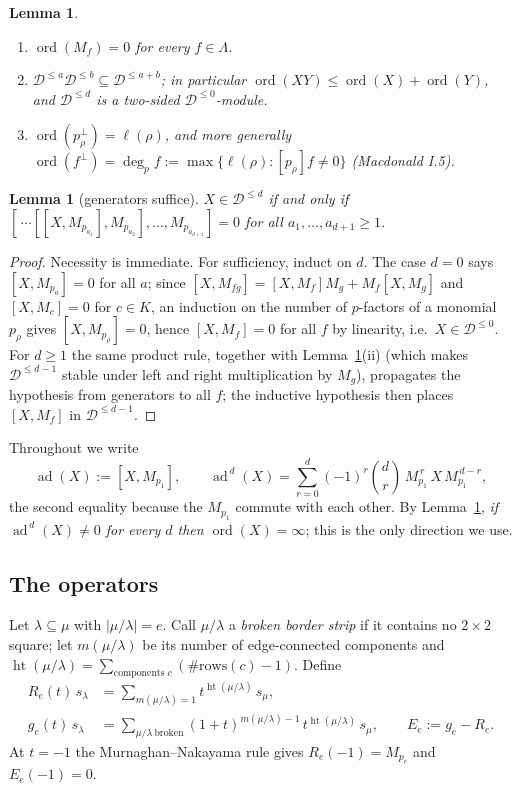 \documentclass[11pt]{article}
\theoremstyle{plain}
\newtheorem{lemma}[theorem]{Lemma}
\theoremstyle{definition}
\DeclareMathOperator{\ord}{ord}
\DeclareMathOperator{\hgt}{ht}
\DeclareMathOperator{\ad}{ad}
\newcommand{\LL}{\Lambda}
\begin{document}
\begin{lemma}\label{lem:std}
\begin{enumerate}
\item[(i)] $\ord(M_f)=0$ for every $f\in\LL$.
\item[(ii)] $\mathcal D^{\le a}\mathcal D^{\le b}\subseteq\mathcal D^{\le a+b}$;
in particular $\ord(XY)\le\ord(X)+\ord(Y)$, and $\mathcal D^{\le d}$ is a
two-sided $\mathcal D^{\le0}$-module.
\item[(iii)] $\ord(p_\rho^{\perp})=\ell(\rho)$, and more generally
$\ord(f^{\perp})=\deg_p f:=\max\{\ell(\rho):[p_\rho]f\neq0\}$
\emph{(Macdonald I.5)}.
\end{enumerate}
\end{lemma}

\begin{lemma}[generators suffice]\label{lem:gen}
$X\in\mathcal D^{\le d}$ if and only if
$[\,\cdots[[X,M_{p_{a_1}}],M_{p_{a_2}}],\dots,M_{p_{a_{d+1}}}]=0$
for all $a_1,\dots,a_{d+1}\ge1$.
\end{lemma}

\begin{proof}
Necessity is immediate.  For sufficiency, induct on $d$.  The case $d=0$ says
$[X,M_{p_a}]=0$ for all $a$; since $[X,M_{fg}]=[X,M_f]M_g+M_f[X,M_g]$ and
$[X,M_c]=0$ for $c\in K$, an induction on the number of $p$-factors of a
monomial $p_\rho$ gives $[X,M_{p_\rho}]=0$, hence $[X,M_f]=0$ for all $f$ by
linearity, i.e.\ $X\in\mathcal D^{\le0}$.  For $d\ge1$ the same product rule,
together with Lemma~\ref{lem:std}(ii) (which makes $\mathcal D^{\le d-1}$ stable
under left and right multiplication by $M_g$), propagates the hypothesis from
generators to all $f$; the inductive hypothesis then places $[X,M_f]$ in
$\mathcal D^{\le d-1}$.
\end{proof}

Throughout we write
\[
  \ad(X):=[X,M_{p_1}],\qquad
  \ad^{\,d}(X)=\sum_{r=0}^{d}(-1)^r\binom{d}{r}\,M_{p_1}^{\,r}\,X\,M_{p_1}^{\,d-r},
\]
the second equality because the $M_{p_1}$ commute with each other.  By
Lemma~\ref{lem:gen}, \emph{if $\ad^{\,d}(X)\neq0$ for every $d$ then
$\ord(X)=\infty$}; this is the only direction we use.

\subsection{The operators}

Let $\lambda\subseteq\mu$ with $|\mu/\lambda|=e$.  Call $\mu/\lambda$ a
\emph{broken border strip} if it contains no $2\times2$ square; let
$m(\mu/\lambda)$ be its number of edge-connected components and
$\hgt(\mu/\lambda)=\sum_{\text{components }c}(\#\text{rows}(c)-1)$.  Define
\begin{align*}
  R_e(t)\,s_\lambda &=\textstyle\sum_{m(\mu/\lambda)=1} t^{\hgt(\mu/\lambda)}\,s_\mu,\\
  g_e(t)\,s_\lambda &=\textstyle\sum_{\mu/\lambda\ \mathrm{broken}}
        (1+t)^{m(\mu/\lambda)-1}\,t^{\hgt(\mu/\lambda)}\,s_\mu,
  \qquad E_e:=g_e-R_e .
\end{align*}
At $t=-1$ the Murnaghan--Nakayama rule gives $R_e(-1)=M_{p_e}$ and $E_e(-1)=0$.
\end{document}

